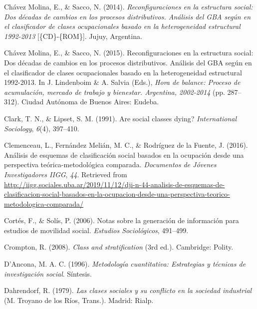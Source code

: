 \documentclass[
]{article}
\newlength{\cslhangindent}
\newlength{\cslentryspacingunit} %
\newenvironment{CSLReferences}[2] %
 {%
  \setlength{\parindent}{0pt}
  \ifodd #1
  \let\oldpar\par
  \def\par{\hangindent=\cslhangindent\oldpar}
  \fi
  \setlength{\parskip}{#2\cslentryspacingunit}
 }%
 {}
\begin{document}
\begin{CSLReferences}{1}{0}
\leavevmode{}%
Chávez Molina, E., \& Sacco, N. (2014). \emph{Reconfiguraciones en la estructura social: Dos décadas de cambios en los procesos distributivos. {Análisis} del {GBA} según en el clasificador de clases ocupacionales basado en la heterogeneidad estructural 1992-2013} {[}\{CD\}-\{ROM\}{]}. Jujuy, Argentina.

\leavevmode{}%
Chávez Molina, E., \& Sacco, N. (2015). Reconfiguraciones en la estructura social: Dos décadas de cambios en los procesos distributivos. {Análisis} del {GBA} según en el clasificador de clases ocupacionales basado en la heterogeneidad estructural 1992-2013. In J. Lindenboim \& A. Salvia (Eds.), \emph{Hora de balance: Proceso de acumulación, mercado de trabajo y bienestar. {Argentina}, 2002-2014} (pp. 287--312). Ciudad Autónoma de Buenos Aires: Eudeba.

\leavevmode{}%
Clark, T. N., \& Lipset, S. M. (1991). Are social classes dying? \emph{International Sociology}, \emph{6}(4), 397--410.

\leavevmode{}%
Clemenceau, L., Fernández Melián, M. C., \& Rodríguez de la Fuente, J. (2016). Análisis de esquemas de clasificación social basados en la ocupación desde una perspectiva teórica-metodológica comparada. \emph{Documentos de Jóvenes Investigadores IIGG}, \emph{44}. Retrieved from \url{http://iigg.sociales.uba.ar/2019/11/12/dji-n-44-analisis-de-esquemas-de-clasificacion-social-basados-en-la-ocupacion-desde-una-perspectiva-teorico-metodologica-comparada/}

\leavevmode{}%
Cortés, F., \& Solís, P. (2006). Notas sobre la generación de información para estudios de movilidad social. \emph{Estudios Sociológicos}, 491--499.

\leavevmode{}%
Crompton, R. (2008). \emph{Class and stratification} (3rd ed.). Cambridge: Polity.

\leavevmode{}%
D'Ancona, M. A. C. (1996). \emph{Metodología cuantitativa: Estrategias y técnicas de investigación social}. Síntesis.

\leavevmode{}%
Dahrendorf, R. (1979). \emph{Las clases sociales y su conflicto en la sociedad industrial} (M. Troyano de los Ríos, Trans.). Madrid: Rialp.


\end{CSLReferences}
\end{document}
